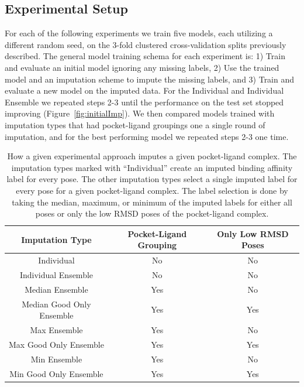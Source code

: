 \documentclass[journal=jcim,manuscript=article]{achemso}
\begin{document}
\subsection{Experimental Setup}
For each of the following experiments we train five models, each utilizing a different random seed, on the 3-fold clustered cross-validation splits previously described.
The general model training schema for each experiment is: 1) Train and evaluate an initial model ignoring any missing labels, 2) Use the trained model and an imputation scheme to impute the missing labels, and 3) Train and evaluate a new model on the imputed data. For the Individual and Individual Ensemble we repeated steps 2-3 until the performance on the test set stopped improving (Figure~\ref{fig:initialImp}).
We then compared models trained with imputation types that had pocket-ligand groupings one a single round of imputation, and for the best performing model we repeated steps 2-3 one time.

\begin{table}
    \centering
    \begin{tabular}{c|c|c}
         Imputation Type & Pocket-Ligand Grouping & Only Low RMSD Poses \\
         \hline
         Individual & No & No \\
        \hline
         Individual Ensemble & No & No \\
         \hline
         Median Ensemble & Yes & No \\
         Median Good Only Ensemble & Yes & Yes \\
         Max Ensemble & Yes & No \\
         Max Good Only Ensemble & Yes & Yes \\
         Min Ensemble & Yes & No \\
         Min Good Only Ensemble & Yes & Yes \\
    \end{tabular}
    \caption{How a given experimental approach imputes a given pocket-ligand complex. The imputation types marked with ``Individual'' create an imputed binding affinity label for every pose. The other imputation types select a single imputed label for every pose for a given pocket-ligand complex. The label selection is done by taking the median, maximum, or minimum of the imputed labels for either all poses or only the low RMSD poses of the pocket-ligand complex.}
    \label{tab:expApproach}
\end{table}
\end{document}

